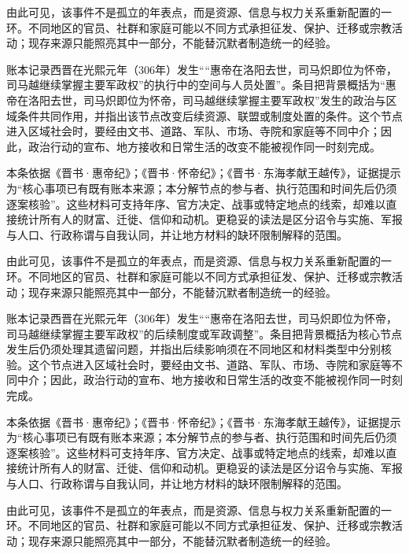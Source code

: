由此可见，该事件不是孤立的年表点，而是资源、信息与权力关系重新配置的一环。不同地区的官员、社群和家庭可能以不同方式承担征发、保护、迁移或宗教活动；现存来源只能照亮其中一部分，不能替沉默者制造统一的经验。

账本记录西晋在光熙元年（306年）发生““惠帝在洛阳去世，司马炽即位为怀帝，司马越继续掌握主要军政权”的执行中的空间与人员处置”。条目把背景概括为“惠帝在洛阳去世，司马炽即位为怀帝，司马越继续掌握主要军政权”发生的政治与区域条件共同作用，并指出该节点改变后续资源、联盟或制度处置的条件。这个节点进入区域社会时，要经由文书、道路、军队、市场、寺院和家庭等不同中介；因此，政治行动的宣布、地方接收和日常生活的改变不能被视作同一时刻完成。

本条依据《晋书·惠帝纪》；《晋书·怀帝纪》；《晋书·东海孝献王越传》，证据提示为“核心事项已有既有账本来源；本分解节点的参与者、执行范围和时间先后仍须逐案核验”。这些材料可支持年序、官方决定、战事或特定地点的线索，却难以直接统计所有人的财富、迁徙、信仰和动机。更稳妥的读法是区分诏令与实施、军报与人口、行政称谓与自我认同，并让地方材料的缺环限制解释的范围。

由此可见，该事件不是孤立的年表点，而是资源、信息与权力关系重新配置的一环。不同地区的官员、社群和家庭可能以不同方式承担征发、保护、迁移或宗教活动；现存来源只能照亮其中一部分，不能替沉默者制造统一的经验。

账本记录西晋在光熙元年（306年）发生““惠帝在洛阳去世，司马炽即位为怀帝，司马越继续掌握主要军政权”的后续制度或军政调整”。条目把背景概括为核心节点发生后仍须处理其遗留问题，并指出后续影响须在不同地区和材料类型中分别核验。这个节点进入区域社会时，要经由文书、道路、军队、市场、寺院和家庭等不同中介；因此，政治行动的宣布、地方接收和日常生活的改变不能被视作同一时刻完成。

本条依据《晋书·惠帝纪》；《晋书·怀帝纪》；《晋书·东海孝献王越传》，证据提示为“核心事项已有既有账本来源；本分解节点的参与者、执行范围和时间先后仍须逐案核验”。这些材料可支持年序、官方决定、战事或特定地点的线索，却难以直接统计所有人的财富、迁徙、信仰和动机。更稳妥的读法是区分诏令与实施、军报与人口、行政称谓与自我认同，并让地方材料的缺环限制解释的范围。

由此可见，该事件不是孤立的年表点，而是资源、信息与权力关系重新配置的一环。不同地区的官员、社群和家庭可能以不同方式承担征发、保护、迁移或宗教活动；现存来源只能照亮其中一部分，不能替沉默者制造统一的经验。

